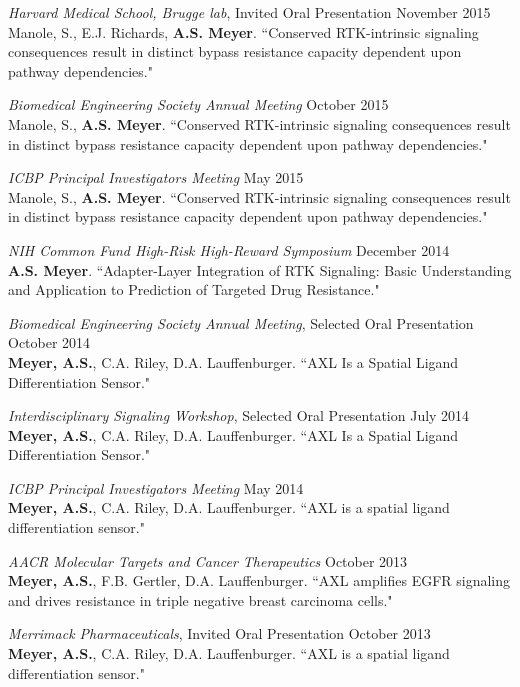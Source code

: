 \documentclass[11pt]{res}
\begin{document}
\begin{resume}
{\sl Harvard Medical School, Brugge lab}, Invited Oral Presentation \hfill November 2015 \\
Manole, S., E.J. Richards, {\bf A.S. Meyer}. ``Conserved RTK-intrinsic signaling consequences result in distinct bypass resistance capacity dependent upon pathway dependencies."

{\sl Biomedical Engineering Society Annual Meeting} \hfill October 2015 \\
Manole, S., {\bf A.S. Meyer}. ``Conserved RTK-intrinsic signaling consequences result in distinct bypass resistance capacity dependent upon pathway dependencies."

{\sl ICBP Principal Investigators Meeting} \hfill May 2015 \\
Manole, S., {\bf A.S. Meyer}. ``Conserved RTK-intrinsic signaling consequences result in distinct bypass resistance capacity dependent upon pathway dependencies."

{\sl NIH Common Fund High-Risk High-Reward Symposium} \hfill December 2014 \\
{\bf A.S. Meyer}. ``Adapter-Layer Integration of RTK Signaling: Basic Understanding and Application to Prediction of Targeted Drug Resistance."

{\sl Biomedical Engineering Society Annual Meeting}, Selected Oral Presentation \hfill October 2014 \\
{\bf Meyer, A.S.}, C.A. Riley, D.A. Lauffenburger. ``AXL Is a Spatial Ligand Differentiation Sensor."

{\sl Interdisciplinary Signaling Workshop}, Selected Oral Presentation \hfill July 2014 \\
{\bf Meyer, A.S.}, C.A. Riley, D.A. Lauffenburger. ``AXL Is a Spatial Ligand Differentiation Sensor."

{\sl ICBP Principal Investigators Meeting} \hfill May 2014 \\
{\bf Meyer, A.S.}, C.A. Riley, D.A. Lauffenburger. ``AXL is a spatial ligand differentiation sensor."

{\sl AACR Molecular Targets and Cancer Therapeutics} \hfill October 2013 \\
{\bf Meyer, A.S.}, F.B. Gertler, D.A. Lauffenburger. ``AXL amplifies EGFR signaling and drives resistance in triple negative breast carcinoma cells."

{\sl Merrimack Pharmaceuticals}, Invited Oral Presentation \hfill October 2013 \\
{\bf Meyer, A.S.}, C.A. Riley, D.A. Lauffenburger. ``AXL is a spatial ligand differentiation sensor."


\end{resume}
\end{document}
